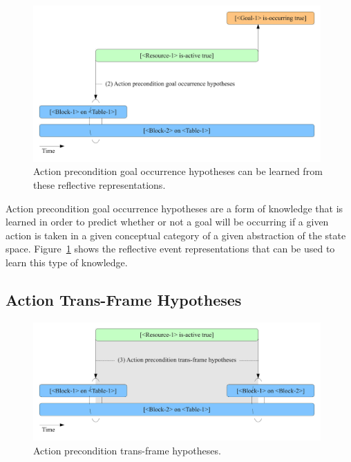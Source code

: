 \begin{figure}[bth]
  \center
  \includegraphics[width=11cm]{gfx/learning_to_plan-2-action_precondition_goal_occurrence_hypotheses}
  \caption[Action precondition goal occurrence hypotheses]{Action
    precondition goal occurrence hypotheses can be learned from these
    reflective representations.}
  \label{fig:action_precondition_goal_occurrence_hypotheses}
\end{figure}

Action precondition goal occurrence hypotheses are a form of knowledge
that is learned in order to predict whether or not a goal will be
occurring if a given action is taken in a given conceptual category of
a given abstraction of the state space.
Figure~\ref{fig:action_precondition_goal_occurrence_hypotheses} shows
the reflective event representations that can be used to learn this
type of knowledge.

\subsection{Action Trans-Frame Hypotheses}
\label{sec:learning_trans_frames_for_events}

\begin{figure}[bth]
  \center
  \includegraphics[width=11cm]{gfx/learning_to_plan-3-action_precondition_transframe_hypotheses}
  \caption[Action precondition trans-frame hypotheses]{Action precondition trans-frame hypotheses.}
  \label{fig:action_precondition_transframe_hypotheses}
\end{figure}

